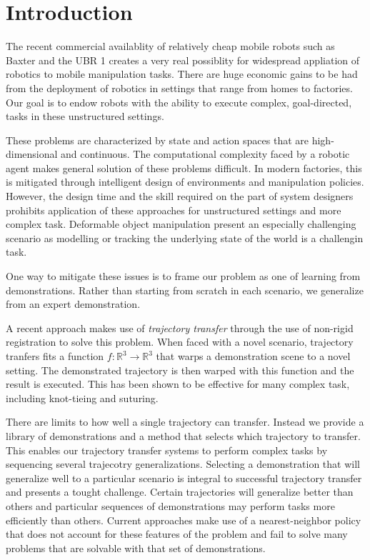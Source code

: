 \section{Introduction}
The recent commercial availablity of relatively cheap mobile robots such as Baxter and the UBR 1 
creates a very real possiblity for widespread appliation of robotics to mobile manipulation tasks.
There are huge economic gains to be had from the deployment of robotics in settings that range from homes to factories.
Our goal is to endow robots with the ability to execute complex, goal-directed, tasks in these unstructured settings.

These problems are characterized by state and action spaces that are high-dimensional and continuous.
The computational complexity faced by a robotic agent makes general solution of these problems difficult.
In modern factories, this is mitigated through intelligent design of environments and manipulation policies.
However, the design time and the skill required on the part of system designers prohibits application of these approaches for unstructured settings and more complex task.
Deformable object manipulation present an especially challenging scenario as modelling or tracking the underlying state of the world is a challengin task.

One way to mitigate these issues is to frame our problem as one of learning from demonstrations.
Rather than starting from scratch in each scenario, we generalize from an expert demonstration.

A recent approach makes use of \emph{trajectory transfer} through the use of non-rigid registration to solve this problem.
When faced with a novel scenario, trajectory tranfers fits a function $f:\mathbb{R}^3 \rightarrow \mathbb{R}^3$ that warps a demonstration scene to a novel setting.
The demonstrated trajectory is then warped with this function and the result is executed. 
This has been shown to be effective for many complex task, including knot-tieing and suturing.

There are limits to how well a single trajectory can transfer. 
Instead we provide a library of demonstrations and a method that selects which trajectory to transfer.
This enables our trajectory transfer systems to perform complex tasks by sequencing several trajecotry generalizations.
Selecting a demonstration that will generalize well to a particular scenario is integral to successful trajectory transfer and presents a tought challenge. 
Certain trajectories will generalize better than others and particular sequences of demonstrations may perform tasks more efficiently than others.
Current approaches make use of a nearest-neighbor policy that does not account for these features of the problem and fail to solve many problems that are solvable with that set of demonstrations.

